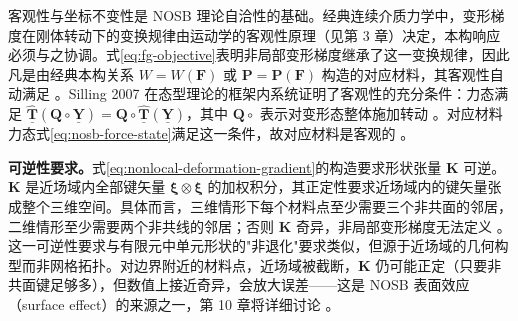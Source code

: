 \begin{remark}
  客观性与坐标不变性是 NOSB 理论自洽性的基础。经典连续介质力学中，变形梯度在刚体转动下的变换规律由运动学的客观性原理（见第 3 章）决定，本构响应必须与之协调。式\eqref{eq:fg-objective}表明非局部变形梯度继承了这一变换规律，因此凡是由经典本构关系 $W=W(\mathbf{F})$ 或 $\mathbf{P}=\mathbf{P}(\mathbf{F})$ 构造的对应材料，其客观性自动满足 \cite{Silling2007}。Silling 2007 在态型理论的框架内系统证明了客观性的充分条件：力态满足 $\hat{\underline{\mathbf{T}}}(\mathbf{Q}\circ\underline{\mathbf{Y}})=\mathbf{Q}\circ\hat{\underline{\mathbf{T}}}(\underline{\mathbf{Y}})$，其中 $\mathbf{Q}\circ$ 表示对变形态整体施加转动 \cite{Silling2007}。对应材料力态式\eqref{eq:nosb-force-state}满足这一条件，故对应材料是客观的 \cite{Silling2007,LeBobaru2018Obj}。
\end{remark}

\textbf{可逆性要求。}式\eqref{eq:nonlocal-deformation-gradient}的构造要求形状张量 $\mathbf{K}$ 可逆。$\mathbf{K}$ 是近场域内全部键矢量 $\boldsymbol{\xi}\otimes\boldsymbol{\xi}$ 的加权积分，其正定性要求近场域内的键矢量张成整个三维空间。具体而言，三维情形下每个材料点至少需要三个非共面的邻居，二维情形至少需要两个非共线的邻居；否则 $\mathbf{K}$ 奇异，非局部变形梯度无法定义 \cite{Warren2009}。这一可逆性要求与有限元中单元形状的"非退化"要求类似，但源于近场域的几何构型而非网格拓扑。对边界附近的材料点，近场域被截断，$\mathbf{K}$ 仍可能正定（只要非共面键足够多），但数值上接近奇异，会放大误差——这是 NOSB 表面效应（surface effect）的来源之一，第 10 章将详细讨论 \cite{LeBobaru2018}。

